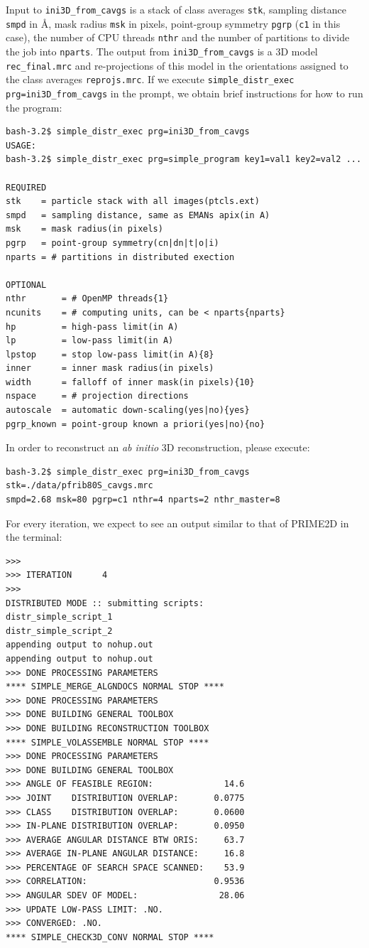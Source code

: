 \documentclass[a4paper,11pt]{article}
\newcommand{\prgname}[1]{\textcolor{NavyBlue}{\texttt{#1}}}
\begin{document}
Input to \prgname{ini3D\_from\_cavgs} is a stack of class averages \texttt{stk}, sampling distance \texttt{smpd} in \AA{}, mask radius \texttt{msk} in pixels, point-group symmetry \texttt{pgrp} (\texttt{c1} in this case), the number of CPU threads \texttt{nthr} and the number of partitions to divide the job into \texttt{nparts}. The output from \prgname{ini3D\_from\_cavgs} is a 3D model \texttt{rec\_final.mrc} and re-projections of this model in the orientations assigned to the class averages \texttt{reprojs.mrc}. If we execute \texttt{simple\_distr\_exec prg=ini3D\_from\_cavgs} in the prompt, we obtain brief instructions for how to run the program:
\begin{verbatim}
bash-3.2$ simple_distr_exec prg=ini3D_from_cavgs
USAGE:
bash-3.2$ simple_distr_exec prg=simple_program key1=val1 key2=val2 ...

REQUIRED
stk    = particle stack with all images(ptcls.ext)
smpd   = sampling distance, same as EMANs apix(in A)
msk    = mask radius(in pixels)
pgrp   = point-group symmetry(cn|dn|t|o|i)
nparts = # partitions in distributed exection

OPTIONAL
nthr       = # OpenMP threads{1}
ncunits    = # computing units, can be < nparts{nparts}
hp         = high-pass limit(in A)
lp         = low-pass limit(in A)
lpstop     = stop low-pass limit(in A){8}
inner      = inner mask radius(in pixels)
width      = falloff of inner mask(in pixels){10}
nspace     = # projection directions
autoscale  = automatic down-scaling(yes|no){yes}
pgrp_known = point-group known a priori(yes|no){no}\end{verbatim}
In order to reconstruct an \textit{ab initio} 3D reconstruction, please execute:
\begin{verbatim}
bash-3.2$ simple_distr_exec prg=ini3D_from_cavgs stk=./data/pfrib80S_cavgs.mrc
smpd=2.68 msk=80 pgrp=c1 nthr=4 nparts=2 nthr_master=8
\end{verbatim}
For every iteration, we expect to see an output similar to that of PRIME2D in the terminal:
\begin{verbatim}
>>>
>>> ITERATION      4
>>>
DISTRIBUTED MODE :: submitting scripts:
distr_simple_script_1
distr_simple_script_2
appending output to nohup.out
appending output to nohup.out
>>> DONE PROCESSING PARAMETERS
**** SIMPLE_MERGE_ALGNDOCS NORMAL STOP ****
>>> DONE PROCESSING PARAMETERS
>>> DONE BUILDING GENERAL TOOLBOX
>>> DONE BUILDING RECONSTRUCTION TOOLBOX
**** SIMPLE_VOLASSEMBLE NORMAL STOP ****
>>> DONE PROCESSING PARAMETERS
>>> DONE BUILDING GENERAL TOOLBOX
>>> ANGLE OF FEASIBLE REGION:              14.6
>>> JOINT    DISTRIBUTION OVERLAP:       0.0775
>>> CLASS    DISTRIBUTION OVERLAP:       0.0600
>>> IN-PLANE DISTRIBUTION OVERLAP:       0.0950
>>> AVERAGE ANGULAR DISTANCE BTW ORIS:     63.7
>>> AVERAGE IN-PLANE ANGULAR DISTANCE:     16.8
>>> PERCENTAGE OF SEARCH SPACE SCANNED:    53.9
>>> CORRELATION:                         0.9536
>>> ANGULAR SDEV OF MODEL:                28.06
>>> UPDATE LOW-PASS LIMIT: .NO.
>>> CONVERGED: .NO.
**** SIMPLE_CHECK3D_CONV NORMAL STOP ****
\end{verbatim}
\end{document}
